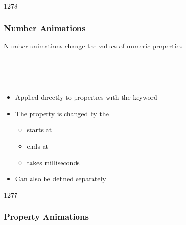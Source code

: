 \begin{slide}{1278}\frametitle{Number Animations}

Number animations change the values of numeric properties

\vspace*{0.5em}
\begin{qml}
\\
\\
\\
\qtt{\}}
\end{qml}

\begin{itemize}
\item Applied directly to properties with the  keyword
\item The  property is changed by the 
  \begin{itemize}
  \item starts at 
  \item ends at 
  \item takes  milliseconds
  \end{itemize}
\item Can also be defined separately
\end{itemize}

\end{slide}


\begin{slide}{1277}\frametitle{Property Animations}



\end{slide}


